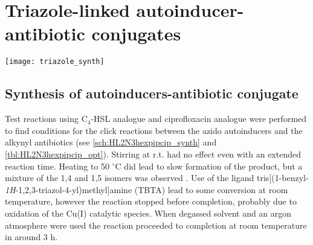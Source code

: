 \section{Triazole-linked autoinducer-antibiotic conjugates}

\begin{scheme}[H]
	\begin{center}
		\texttt{[image: triazole\_synth]}
		\caption{\label{sch:}}
	\end{center}
\end{scheme}

\subsection{Synthesis of autoinducers-antibiotic conjugate }

Test reactions using C$_4$-HSL analogue  and ciprofloxacin analogue  were performed to find conditions for the click reactions between the azido autoinducers and the alkynyl antibiotics (see \ref{sch:HL2N3hexpipcip_synth} and \ref{tbl:HL2N3hexpipcip_opt}). Stirring at r.t. had no effect even with an extended reaction time. Heating to 50 $^{\circ}$C did lead to slow formation of the product, but a mixture of the 1,4  and 1,5  isomers was observed . Use of the ligand tris[(1-benzyl-\textit{1H}-1,2,3-triazol-4-yl)methyl]amine (TBTA)  lead to some conversion at room temperature, however the reaction stopped before completion, probably due to oxidation of the Cu(I) catalytic species. When degassed solvent and an argon atmosphere were used the reaction proceeded to completion at room temperature in around 3 h.


